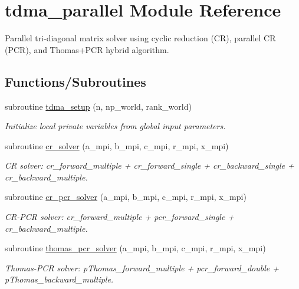 \hypertarget{namespacetdma__parallel}{}\section{tdma\+\_\+parallel Module Reference}
\label{namespacetdma__parallel}


Parallel tri-\/diagonal matrix solver using cyclic reduction (CR), parallel CR (P\+CR), and Thomas+\+P\+CR hybrid algorithm.  


\subsection*{Functions/\+Subroutines}
\begin{DoxyCompactItemize}
\item 
subroutine \mbox{\hyperlink{namespacetdma__parallel_a7aa2a590feb83632170b7cb7b74fefd3}{tdma\+\_\+setup}} (n, np\+\_\+world, rank\+\_\+world)
\begin{DoxyCompactList}\small\item\em Initialize local private variables from global input parameters. \end{DoxyCompactList}\item 
subroutine \mbox{\hyperlink{namespacetdma__parallel_abfb0b9e0d8e67acbd6d8cfa390faee6a}{cr\+\_\+solver}} (a\+\_\+mpi, b\+\_\+mpi, c\+\_\+mpi, r\+\_\+mpi, x\+\_\+mpi)
\begin{DoxyCompactList}\small\item\em CR solver\+: cr\+\_\+forward\+\_\+multiple + cr\+\_\+forward\+\_\+single + cr\+\_\+backward\+\_\+single + cr\+\_\+backward\+\_\+multiple. \end{DoxyCompactList}\item 
subroutine \mbox{\hyperlink{namespacetdma__parallel_a5b221ee60f9b10b484cd5439f5b485f0}{cr\+\_\+pcr\+\_\+solver}} (a\+\_\+mpi, b\+\_\+mpi, c\+\_\+mpi, r\+\_\+mpi, x\+\_\+mpi)
\begin{DoxyCompactList}\small\item\em C\+R-\/\+P\+CR solver\+: cr\+\_\+forward\+\_\+multiple + pcr\+\_\+forward\+\_\+single + cr\+\_\+backward\+\_\+multiple. \end{DoxyCompactList}\item 
subroutine \mbox{\hyperlink{namespacetdma__parallel_a03041ff2dce526db1fed51ab87b84da5}{thomas\+\_\+pcr\+\_\+solver}} (a\+\_\+mpi, b\+\_\+mpi, c\+\_\+mpi, r\+\_\+mpi, x\+\_\+mpi)
\begin{DoxyCompactList}\small\item\em Thomas-\/\+P\+CR solver\+: p\+Thomas\+\_\+forward\+\_\+multiple + pcr\+\_\+forward\+\_\+double + p\+Thomas\+\_\+backward\+\_\+multiple. \end{DoxyCompactList}\item 

\end{DoxyCompactItemize}
